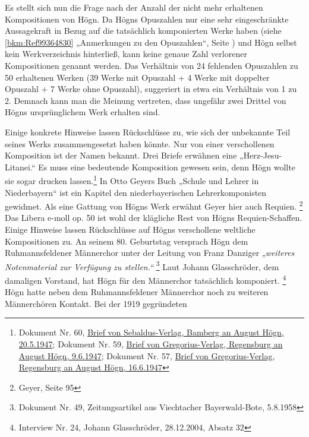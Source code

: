 \documentclass[a4paper]{article}
\newcommand\textstyleZitate[1]{\textit{#1}}
\newcommand\textstyleFunotenTextZchn[1]{#1}
\begin{document}
Es stellt sich nun die Frage nach der Anzahl der nicht mehr erhaltenen
Kompositionen von Högn. Da Högns Opuszahlen nur eine sehr
eingeschränkte Aussagekraft in Bezug auf die tatsächlich komponierten
Werke haben (siehe \ref{bkm:Ref99364830} „Anmerkungen zu den
Opuszahlen“, Seite \pageref{bkm:Ref98509933}) und Högn selbst kein
Werkverzeichnis hinterließ, kann keine genaue Zahl verlorener
Kompositionen genannt werden. Das Verhältnis von 24 fehlenden
Opuszahlen zu 50 erhaltenen Werken (39 Werke mit Opuszahl + 4 Werke mit
doppelter Opuszahl + 7 Werke ohne Opuszahl), suggeriert in etwa ein
Verhältnis von 1 zu 2. Demnach kann man die Meinung vertreten, dass
ungefähr zwei Drittel von Högns ursprünglichem Werk erhalten sind.

Einige konkrete Hinweise lassen Rückschlüsse zu, wie sich der unbekannte
Teil seines Werks zusammengesetzt haben könnte. Nur von einer
verschollenen Komposition ist der Namen bekannt. Drei Briefe erwähnen
eine „Herz-Jesu-Litanei.“ Es muss eine bedeutende Komposition gewesen
sein, denn Högn wollte sie sogar drucken lassen.\footnote{
\textstyleFunotenTextZchn{Dokument Nr. 60,
}\href{http://localhost/hoegn/dokumente/dokumente_einzeln.php?id=60}{\textstyleFunotenTextZchn{Brief
von Sebaldus-Verlag, Bamberg an August Högn,
20.5.1947}}\textstyleFunotenTextZchn{; Dokument Nr. 59,
}\href{http://localhost/hoegn/dokumente/dokumente_einzeln.php?id=59}{\textstyleFunotenTextZchn{Brief
von Gregorius-Verlag, Regensburg an August Högn,
9.6.1947}}\textstyleFunotenTextZchn{; Dokument Nr. 57,
}\href{http://localhost/hoegn/dokumente/dokumente_einzeln.php?id=57}{\textstyleFunotenTextZchn{Brief
von Gregorius-Verlag, Regensburg an August Högn, 16.6.1947}}} In Otto
Geyers Buch „Schule und Lehrer in Niederbayern“ ist ein Kapitel den
niederbayerischen Lehrerkomponisten gewidmet. Als eine Gattung von
Högns Werk erwähnt Geyer hier auch Requien. \footnote{Geyer, Seite 95}
Das Libera e-moll op. 50 ist wohl der klägliche Rest von Högns
Requien-Schaffen. Einige Hinweise lassen Rückschlüsse auf Högns
verschollene weltliche Kompositionen zu. An seinem 80. Geburtstag
versprach Högn dem Ruhmannsfeldener Männerchor unter der Leitung von
Franz Danziger \textstyleZitate{„weiteres Notenmaterial zur Verfügung
zu stellen.“ } \footnote{Dokument Nr. 49, Zeitungsartikel aus
Viechtacher Bayerwald-Bote, 5.8.1958} Laut Johann Glasschröder, dem
damaligen Vorstand, hat Högn für den Männerchor tatsächlich
komponiert. \footnote{Interview Nr. 24, Johann Glasschröder,
28.12.2004, Absatz 32} Högn hatte neben dem Ruhmannsfeldener Männerchor
noch zu weiteren Männerchören Kontakt. Bei der 1919 gegründeten
\end{document}
